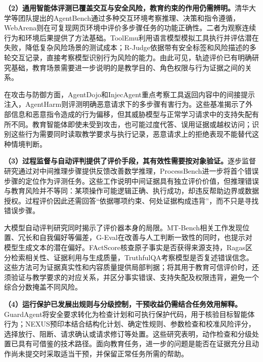 \textbf{（2）通用智能体评测已覆盖交互与安全风险，教育约束的作用仍需辨明。}清华大学等团队提出的AgentBench通过多种交互环境考察推理、决策和指令遵循，WebArena则在可复现网页环境中评价多步骤任务的功能正确性\cite{liu2023agentbench,zhou2023webarena}。二者为观察连续行为和环境后果提供了方法基础。ToolEmu利用语言模型模拟工具执行并评估潜在失败，降低复杂风险场景的测试成本；R-Judge依据带有安全标签和风险描述的多轮交互记录，直接考察模型识别行为风险的能力\cite{ruan2023toolemu,yuan2024rjudge}。由此可见，轨迹评价已有明确研究基础，教育场景需要进一步说明的是教学目的、角色权限与行为证据之间的关系。

在攻击与防御方面，AgentDojo和InjecAgent重点考察工具返回内容中的间接提示注入，AgentHarm则评测明确恶意请求下的多步骤有害行为\cite{debenedetti2024agentdojo,zhan2024injecagent,andriushchenko2024agentharm}。这些基准揭示了外部信息和恶意指令造成的行为偏移，但其威胁模型与正常学习请求中的支持失配有所不同。教育智能体即使未受到攻击，也可能过度代答、误用证据或越权访问；识别这些行为需要同时读取教学要求与执行记录，恶意请求上的拒绝表现不能替代这种情境判断。

\textbf{（3）过程监督与自动评判提供了评价手段，其有效性需要按对象验证。}逐步监督研究通过对中间推理步骤提供反馈改善数学推理，ProcessBench进一步将首个错误步骤的定位作为评测任务\cite{lightman2023verify,processbench2024}。这些工作说明中间证据具有独立评价价值，但推理错误与教育风险并不等同：某项操作可能逻辑正确、执行成功，却违反帮助边界或数据授权。过程评价因此还需回答“依据哪项约束、何处证据构成违背”，而不只是寻找错误步骤。

大模型自动评判研究同时揭示了评价器本身的局限。MT-Bench相关工作发现位置、冗长和自我偏好等偏差，G-Eval在改善与人工判断一致性的同时，也提示对模型生成文本的潜在偏好\cite{zheng2023judging,liu2023geval}。FActScore核查原子事实是否获得来源支持，Ragas区分检索相关性、证据利用与生成质量，TruthfulQA考察模型是否复述错误信念\cite{min2023factscore,es2023ragas,lin2021truthfulqa}。这些方法可为证据真实性和内容质量提供局部判据；将其用于教育可信评价时，还须验证与教学要求的对应关系，并区分事实错误、支持失配及权限违背，避免一个综合分数掩盖不同风险。

\textbf{（4）运行保护已发展出规则与分级控制，干预收益仍需结合任务效用解释。}GuardAgent将安全要求转化为检查计划和可执行保护代码，用于核验目标智能体行为；NEXUS预印本结合结构化计划、确定性规则、参数检查和校准风险评分，选择放行、阻断、请求确认或请求修订等处置\cite{xiang2024guardagent,agentguard2026nexus}。这些研究表明，动作检查和分级处置已具有可借鉴的技术路径。面向教育任务，进一步的问题是能否在证据充分且动作尚未提交时采取适当干预，并保留正常任务所需的帮助。

